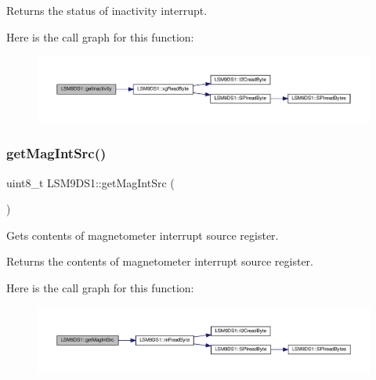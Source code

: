 \begin{DoxyReturn}{Returns}
the status of inactivity interrupt. 
\end{DoxyReturn}
Here is the call graph for this function\+:
\nopagebreak
\begin{figure}[H]
\begin{center}
\leavevmode
\includegraphics[width=350pt]{classLSM9DS1_a9dab029d1d24e49709258d893042d28f_cgraph}
\end{center}
\end{figure}
\mbox{\label{classLSM9DS1_a2bc92a37db982059b89e0a06e7d05a95}} 
\subsubsection{\texorpdfstring{get\+Mag\+Int\+Src()}{getMagIntSrc()}}
{\footnotesize\ttfamily uint8\+\_\+t L\+S\+M9\+D\+S1\+::get\+Mag\+Int\+Src (\begin{DoxyParamCaption}{ }\end{DoxyParamCaption})}



Gets contents of magnetometer interrupt source register. 

\begin{DoxyReturn}{Returns}
the contents of magnetometer interrupt source register. 
\end{DoxyReturn}
Here is the call graph for this function\+:
\nopagebreak
\begin{figure}[H]
\begin{center}
\leavevmode
\includegraphics[width=350pt]{classLSM9DS1_a2bc92a37db982059b89e0a06e7d05a95_cgraph}
\end{center}
\end{figure}
\mbox{\label{classLSM9DS1_a65b71a03a30f4e8ed1ffd46de3db0560}} 
